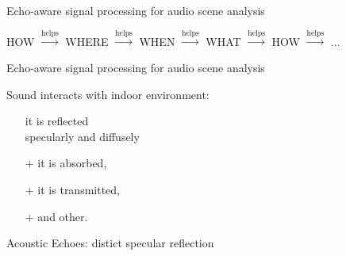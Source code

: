 \begin{frame}[t]{Echo-aware \alert{signal processing} for audio scene analysis}
    \pause
    \vspace{-2mm}
    \begin{center}
        HOW  $\overset{\text{helps}}{\longrightarrow}$ WHERE
            $\overset{\text{helps}}{\longrightarrow}$ WHEN
            $\overset{\text{helps}}{\longrightarrow}$ WHAT
            $\overset{\text{helps}}{\longrightarrow}$ HOW
            $\overset{\text{helps}}{\longrightarrow}$ ...
    \end{center}

\end{frame}


\begin{frame}[t]{\alert{Echo-aware} signal processing for audio scene analysis}

    \begin{block}{Sound interacts with indoor environment:}
        \begin{itemize}
            \item[] it is reflected
            \\\hspace{1em} specularly and diffusely\hspace{1em}
            \item[$+$] it is absorbed,
            \item[$+$] it is transmitted,
            \item[$+$] and other.
        \end{itemize}
    \end{block}


    \begin{mydefblock}{Acoustic Echoes: distict specular reflection}


\end{mydefblock}
\end{frame}
